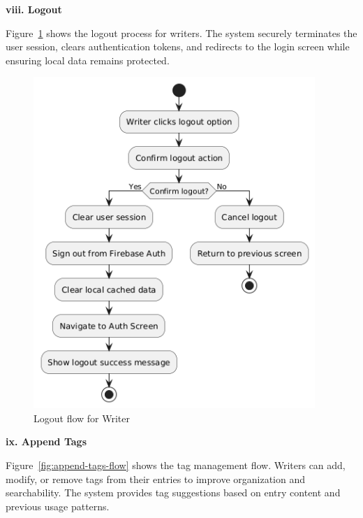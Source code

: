 \textbf{viii. Logout}

Figure~\ref{fig:logout-flow} shows the logout process for writers. The system securely terminates the user session, clears authentication tokens, and redirects to the login screen while ensuring local data remains protected.

\begin{figure}[H]
\centering
\includegraphics[width=0.95\textwidth,height=0.7\textheight,keepaspectratio]{files/imgs/logout_flow.png}
\caption{Logout flow for Writer}
\label{fig:logout-flow}
\end{figure}
\clearpage

\textbf{ix. Append Tags}

Figure~\ref{fig:append-tags-flow} shows the tag management flow. Writers can add, modify, or remove tags from their entries to improve organization and searchability. The system provides tag suggestions based on entry content and previous usage patterns.

